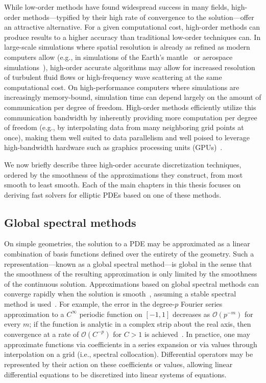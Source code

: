 While low-order methods have found widespread success in many fields, high-order methods---typified by their high rate of convergence to the solution---offer an attractive alternative. For a given computational cost, high-order methods can produce results to a higher accuracy than traditional low-order techniques can. In large-scale simulations where spatial resolution is already as refined as modern computers allow (e.g., in simulations of the Earth's mantle~\cite{Rudi_15_01} or aerospace simulations~\cite{FUN3D}), high-order accurate algorithms may allow for increased resolution of turbulent fluid flows or high-frequency wave scattering at the same computational cost. On high-performance computers where simulations are increasingly memory-bound, simulation time can depend largely on the amount of communication per degree of freedom. High-order methods efficiently utilize this communication bandwidth by inherently providing more computation per degree of freedom (e.g., by interpolating data from many neighboring grid points at once), making them well suited to data parallelism and well poised to leverage high-bandwidth hardware such as graphics processing units (GPUs)~\cite{NASA_Vision_2030}.

We now briefly describe three high-order accurate discretization techniques, ordered by the smoothness of the approximations they construct, from most smooth to least smooth. Each of the main chapters in this thesis focuses on deriving fast solvers for elliptic PDEs based on one of these methods.

\subsection{Global spectral methods}

On simple geometries, the solution to a PDE may be approximated as a linear combination of basis functions defined over the entirety of the geometry. Such a representation---known as a global spectral method---is global in the sense that the smoothness of the resulting approximation is only limited by the smoothness of the continuous solution. Approximations based on global spectral methods can converge rapidly when the solution is smooth~\cite{ATAP}, assuming a stable spectral method is used~\cite{Trefethen_00_01}. For example, the error in the degree-$p$ Fourier series approximation to a $C^\infty$ periodic function on $[-1,1]$ decreases as $\mathcal{O}(p^{-m})$ for every $m$; if the function is analytic in a complex strip about the real axis, then convergence at a rate of $\mathcal{O}(C^{-p})$ for $C>1$ is achieved~\cite{Trefethen_00_01}. In practice, one may approximate functions via coefficients in a series expansion or via values through interpolation on a grid (i.e., spectral collocation). Differential operators may be represented by their action on these coefficients or values, allowing linear differential equations to be discretized into linear systems of equations.

